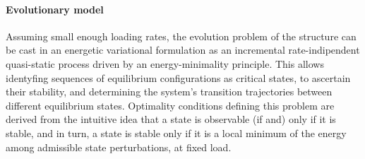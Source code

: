 







\paragraph{Evolutionary model}
\label{sec:stability}

Assuming small enough loading rates, 
the evolution problem of the structure can be cast in an energetic variational formulation as an incremental rate-indipendent quasi-static process driven by an energy-minimality principle.
This allows identyfing sequences of equilibrium configurations as critical states, to ascertain their stability, and determining the system's transition trajectories between different equilibrium states.
Optimality conditions defining this problem are derived from the
intuitive idea that a state is observable (if and) only if it is stable, and in turn, a state is stable only if it is a local minimum of the energy among admissible state perturbations, at fixed load. 

